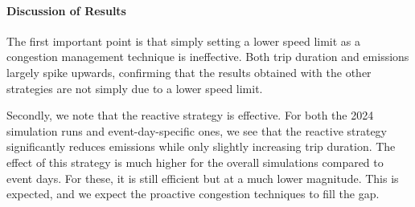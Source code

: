 \begin{table}[!ht]
    \centering
    \caption{Results of congestion management techniques on event-day simulations}
    \label{table:match-sims}
\end{table}

\paragraph{Discussion of Results}
The first important point is that simply setting a lower speed limit as a congestion management technique is ineffective. Both trip duration and emissions largely spike upwards, confirming that the results obtained with the other strategies are not simply due to a lower speed limit.

Secondly, we note that the reactive strategy is effective. For both the 2024 simulation runs and event-day-specific ones, we see that the reactive strategy significantly reduces emissions while only slightly increasing trip duration. The effect of this strategy is much higher for the overall simulations compared to event days. For these, it is still efficient but at a much lower magnitude. This is expected, and we expect the proactive congestion techniques to fill the gap.

